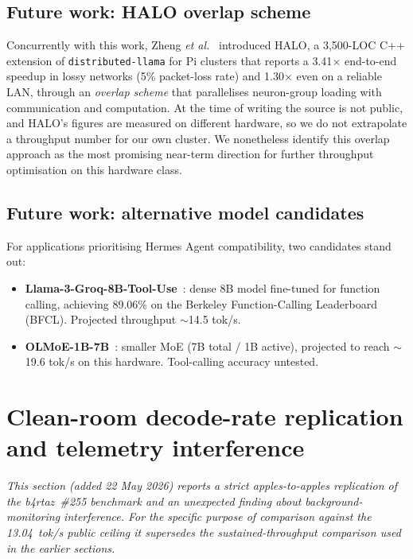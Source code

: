 \documentclass[10pt,a4paper]{article}
\begin{document}
\subsection{Future work: HALO overlap scheme}
\label{sec:future-work-halo}
Concurrently with this work, Zheng \emph{et al.}~\cite{halo2026} introduced HALO, a 3{,}500-LOC C++ extension of \texttt{distributed-llama} for Pi clusters that reports a 3.41$\times$ end-to-end speedup in lossy networks (5\% packet-loss rate) and 1.30$\times$ even on a reliable LAN, through an \emph{overlap scheme} that parallelises neuron-group loading with communication and computation. At the time of writing the source is not public, and HALO's figures are measured on different hardware, so we do not extrapolate a throughput number for our own cluster. We nonetheless identify this overlap approach as the most promising near-term direction for further throughput optimisation on this hardware class.

\subsection{Future work: alternative model candidates}
\label{sec:future-models}
For applications prioritising Hermes Agent compatibility, two candidates stand out:
\begin{itemize}
  \item \textbf{Llama-3-Groq-8B-Tool-Use}~\cite{groq2024tooluse}: dense 8B model fine-tuned for function calling, achieving 89.06\% on the Berkeley Function-Calling Leaderboard (BFCL). Projected throughput $\sim$14.5 tok/s.
  \item \textbf{OLMoE-1B-7B}~\cite{muennighoff2024olmoe}: smaller MoE (7B total / 1B active), projected to reach $\sim$19.6 tok/s on this hardware. Tool-calling accuracy untested.
\end{itemize}

\section{Clean-room decode-rate replication and telemetry interference}
\label{sec:cleanroom-2026-05-22}

\textit{This section (added 22 May 2026) reports a strict apples-to-apples replication of the b4rtaz~\#255 benchmark and an unexpected finding about background-monitoring interference. For the specific purpose of comparison against the 13.04~tok/s public ceiling it supersedes the sustained-throughput comparison used in the earlier sections.}
\end{document}
